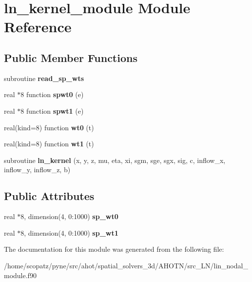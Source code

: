 \hypertarget{classln__kernel__module}{\section{ln\-\_\-kernel\-\_\-module Module Reference}
\label{classln__kernel__module}
}
\subsection*{Public Member Functions}
\begin{DoxyCompactItemize}
\item 
\hypertarget{classln__kernel__module_aad8f2e59c335886b3a8a50e3f132eaa5}{subroutine {\bfseries read\-\_\-sp\-\_\-wts}}\label{classln__kernel__module_aad8f2e59c335886b3a8a50e3f132eaa5}

\item 
\hypertarget{classln__kernel__module_a2714ae332964aba16f4bf2490d4ad586}{real $\ast$8 function {\bfseries spwt0} (e)}\label{classln__kernel__module_a2714ae332964aba16f4bf2490d4ad586}

\item 
\hypertarget{classln__kernel__module_a96ab2ee2973c0667493bf3d5fd00ba04}{real $\ast$8 function {\bfseries spwt1} (e)}\label{classln__kernel__module_a96ab2ee2973c0667493bf3d5fd00ba04}

\item 
\hypertarget{classln__kernel__module_a9ab6aa3cccdaf9b53a929dd30a31961b}{real(kind=8) function {\bfseries wt0} (t)}\label{classln__kernel__module_a9ab6aa3cccdaf9b53a929dd30a31961b}

\item 
\hypertarget{classln__kernel__module_a61433a9c616f7e015071386c1ce8ea4e}{real(kind=8) function {\bfseries wt1} (t)}\label{classln__kernel__module_a61433a9c616f7e015071386c1ce8ea4e}

\item 
\hypertarget{classln__kernel__module_a656058bc673334c98c866f725c8f6c30}{subroutine {\bfseries ln\-\_\-kernel} (x, y, z, mu, eta, xi, sgm, sge, sgx, sig, c, inflow\-\_\-x, inflow\-\_\-y, inflow\-\_\-z, b)}\label{classln__kernel__module_a656058bc673334c98c866f725c8f6c30}

\end{DoxyCompactItemize}
\subsection*{Public Attributes}
\begin{DoxyCompactItemize}
\item 
\hypertarget{classln__kernel__module_acb86edae3ad6ba5f5d76b8480cc1a0c3}{real $\ast$8, dimension(4, 0\-:1000) {\bfseries sp\-\_\-wt0}}\label{classln__kernel__module_acb86edae3ad6ba5f5d76b8480cc1a0c3}

\item 
\hypertarget{classln__kernel__module_a0b4b87e5c568b8a78eaababf7fc2ffba}{real $\ast$8, dimension(4, 0\-:1000) {\bfseries sp\-\_\-wt1}}\label{classln__kernel__module_a0b4b87e5c568b8a78eaababf7fc2ffba}

\end{DoxyCompactItemize}


The documentation for this module was generated from the following file\-:\begin{DoxyCompactItemize}
\item 
/home/scopatz/pyne/src/ahot/spatial\-\_\-solvers\-\_\-3d/\-A\-H\-O\-T\-N/src\-\_\-\-L\-N/lin\-\_\-nodal\-\_\-module.\-f90\end{DoxyCompactItemize}
